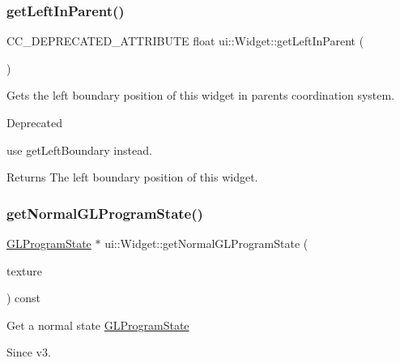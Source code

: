 \subsubsection{\texorpdfstring{get\+Left\+In\+Parent()}{getLeftInParent()}\hspace{0.1cm}{\footnotesize\ttfamily [2/2]}}
{\footnotesize\ttfamily C\+C\+\_\+\+D\+E\+P\+R\+E\+C\+A\+T\+E\+D\+\_\+\+A\+T\+T\+R\+I\+B\+U\+TE float ui\+::\+Widget\+::get\+Left\+In\+Parent (\begin{DoxyParamCaption}{ }\end{DoxyParamCaption})\hspace{0.3cm}{\ttfamily [inline]}}

Gets the left boundary position of this widget in parent\textquotesingle{}s coordination system. \begin{DoxyRefDesc}{Deprecated}
\item[\hyperlink{deprecated__deprecated000403}{Deprecated}]use {\ttfamily get\+Left\+Boundary} instead. \end{DoxyRefDesc}
\begin{DoxyReturn}{Returns}
The left boundary position of this widget. 
\end{DoxyReturn}
\mbox{\label{classui_1_1Widget_a9b1c9831f5e0e869272fb51eddd1c06a}} 
\subsubsection{\texorpdfstring{get\+Normal\+G\+L\+Program\+State()}{getNormalGLProgramState()}\hspace{0.1cm}{\footnotesize\ttfamily [1/2]}}
{\footnotesize\ttfamily \hyperlink{classGLProgramState}{G\+L\+Program\+State} $\ast$ ui\+::\+Widget\+::get\+Normal\+G\+L\+Program\+State (\begin{DoxyParamCaption}\item[{\hyperlink{classTexture2D}{Texture2D} $\ast$}]{texture }\end{DoxyParamCaption}) const\hspace{0.3cm}{\ttfamily [protected]}}

Get a normal state \hyperlink{classGLProgramState}{G\+L\+Program\+State} \begin{DoxySince}{Since}
v3. 
\end{DoxySince}
\mbox{\label{classui_1_1Widget_a2ad2ac71884305f41d5965158c2a44c5}} 
